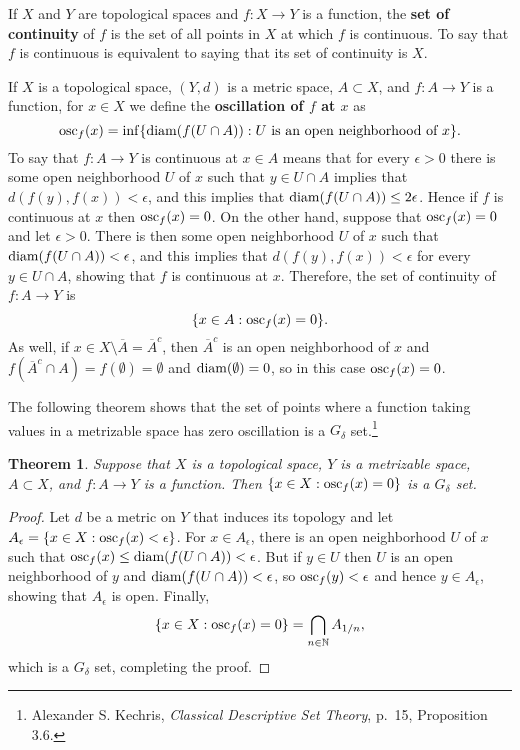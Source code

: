 \documentclass{article}
\newcommand{\diam}{\ensuremath\mathrm{diam}}
\newcommand{\osc}{\ensuremath\mathrm{osc}}
\newtheorem{theorem}{Theorem}
\theoremstyle{definition}
\begin{document}
If $X$ and $Y$ are topological spaces and $f:X \to Y$ is a function, the \textbf{set of continuity} of $f$ is the set of all points in $X$ at which $f$ is continuous.
To say that $f$ is continuous is equivalent to saying that its set of continuity is $X$.

If $X$ is a topological space, $(Y,d)$ is a metric space, $A \subset X$, and $f:A \to Y$ is a function, for $x \in X$ we define the \textbf{oscillation of $f$
at $x$} as
\[
\osc_f(x) = \inf\{ \diam(f(U \cap A)): \textrm{$U$ is an open neighborhood of $x$}\}.
\]
To say that $f:A \to Y$ is continuous at $x \in A$ means that for every $\epsilon>0$ there is some open neighborhood $U$ of $x$ such that
$y \in U \cap A$ implies that $d(f(y),f(x))<\epsilon$, and this implies that $\diam(f(U \cap A)) \leq 2\epsilon$. Hence if $f$ is continuous at $x$ then
$\osc_f(x)=0$. On the other hand, suppose that $\osc_f(x)=0$ and let $\epsilon>0$. There is then some open neighborhood $U$ of $x$
such that $\diam(f(U \cap A))<\epsilon$, and this implies that $d(f(y),f(x))<\epsilon$ for every $y \in U \cap A$, showing that $f$ is continuous at $x$.
Therefore, the set of continuity of $f:A \to Y$ is
\[
\{x \in A: \osc_f(x)=0\}.
\] 
As well, if $x \in X \setminus \overline{A}=\overline{A}^c$, then $\overline{A}^c$ is an open neighborhood of $x$ and $f(\overline{A}^c \cap A) = 
f(\emptyset)=\emptyset$ and $\diam(\emptyset)=0$, so in this case $\osc_f(x)=0$.


The following theorem shows that the set of points where a function taking values in a metrizable space 
has zero oscillation 
is a $G_\delta$ set.\footnote{Alexander S. Kechris, {\em Classical Descriptive Set Theory}, p.~15, Proposition 3.6.}

\begin{theorem}
Suppose that $X$ is a topological space, $Y$ is a metrizable space, $A \subset X$, and $f:A \to Y$ is a function. Then $\{x \in X: \osc_f(x)=0\}$ is a $G_\delta$ set.
\label{continuityset}
\end{theorem}
\begin{proof}
Let $d$ be a metric on $Y$ that induces its topology
and let $A_\epsilon=\{x \in X: \osc_f(x)<\epsilon\}$. For $x \in A_\epsilon$, there is an open neighborhood $U$ of $x$ such that
$\osc_f(x) \leq \diam(f(U \cap A))  < \epsilon$. But if $y \in U$ then $U$ is an open neighborhood of $y$ and $\diam(f(U \cap A))<\epsilon$, 
so $\osc_f(y) < \epsilon$ and hence $y \in A_\epsilon$, showing that $A_\epsilon$ is open.
Finally,
\[
\{x \in X: \osc_f(x)=0\} = \bigcap_{n \in \mathbb{N}} A_{1/n},
\]
which is a $G_\delta$ set, completing the proof.
\end{proof}
\end{document}
